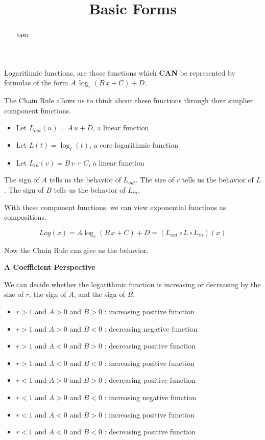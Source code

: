 \documentclass{ximera}
\title{Basic Forms}
\begin{document}
\begin{abstract}
basic
\end{abstract}
\maketitle









Logarithmic functions, are those functions which \textbf{\textcolor{red!80!black}{CAN}} be represented by formulas of the form $A \, \log_r(B \, x + C) + D$.  


The Chain Rule allows us to think about these functions through their simplier component functions.



\begin{itemize}
\item Let $L_{out}(u) = A \, u + D$, a linear function
\item Let $L(t) = \log_r(t)$, a core logarithmic function
\item Let $L_{in}(v) = B \, v + C$, a linear function
\end{itemize}


The sign of $A$ tells us the behavior of $L_{out}$.
The size of $r$ tells us the behavior of $L$.
The sign of $B$ tells us the behavior of $L_{in}$.


With these component functions, we can view exponential functions as compositions.


\[  Log(x) = A \log_r(B \, x + C) + D = (L_{out} \circ L \circ L_{in})(x) \]


Now the Chain Rule can give us the behavior.



\textbf{\textcolor{blue!55!black}{A Coefficient Perspective}} 


We can decide whether the logarithmic function is increasing or decreasing by the size of $r$, the sign of $A$, and the sign of $B$. 





\begin{itemize}
\item $r > 1$ and $A > 0$ and $B > 0$ : increasing positive function
\item $r > 1$ and $A > 0$ and $B < 0$ : decreasing negative function  
\item $r > 1$ and $A < 0$ and $B > 0$ : decreasing positive function
\item $r > 1$ and $A < 0$ and $B < 0$ : increasing positive function
\item $r < 1$ and $A > 0$ and $B > 0$ : decreasing positive function
\item $r < 1$ and $A > 0$ and $B < 0$ : increasing negative function  
\item $r < 1$ and $A < 0$ and $B > 0$ : increasing positive function
\item $r < 1$ and $A < 0$ and $B < 0$ : decreasing positive function
\end{itemize}
\end{document}
